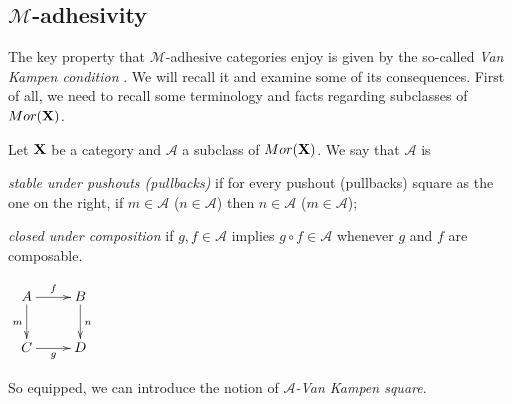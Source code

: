 \documentclass[a4paper,UKenglish,cleveref,pdftex,thm-restate,numberwithinsect,anonymous]{lipics}
\newcommand{\mor}{\mathsf{Mor}}
\def\X{\textbf {\textup{X}}}
\begin{document}
\subsection{$\mathcal{M}$-adhesivity}\label{subsec:ade}
The key property that $\mathcal{M}$-adhesive categories enjoy is given
by the so-called \emph{Van Kampen condition}
\cite{brown1997van,johnstone2007quasitoposes,lack2005adhesive}. We
will recall it and examine some of its consequences. First of all, we
need to recall some terminology and facts regarding subclasses of
$\mor(\X)$.

\begin{definition}
  Let $\X$ be a category and $\mathcal{A}$ a subclass of
  $\mor(\X)$. We say that $\mathcal{A}$ is
  \begin{itemize}
    \parbox{11cm}{\item
      \emph{stable under pushouts (pullbacks)} if for every pushout (pullbacks) square as the one on the right, 	if $m \in \mathcal{A}$ ($n\in \mathcal{A}$) then $n \in \mathcal{A}$ ($m \in \mathcal{A}$);
    \item \emph{closed under composition} if $g, f\in \mathcal{A}$ implies $g\circ f\in \mathcal{A}$ whenever $g$ and $f$ are composable.{\tiny }}\hfill
    \parbox{2cm}{$\xymatrix{A\ar[r]^f  \ar[d]_{m}& B \ar[d]^n \\ C \ar[r]_g & D}$}
    \parbox{11cm}{}\hfill
  \end{itemize}
\end{definition}

So equipped, we can introduce the notion of \emph{$\mathcal{A}$-Van Kampen square}.
\end{document}
